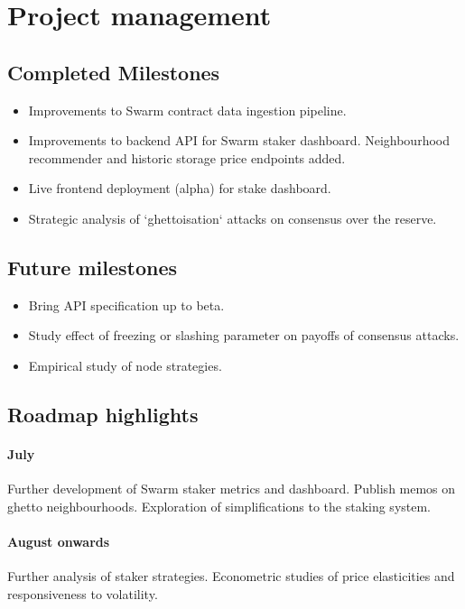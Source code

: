 \section*{Project management}

\subsection*{Completed Milestones}

\begin{itemize}
  \item 
    Improvements to Swarm contract data ingestion pipeline.
  \item 
    Improvements to backend API for Swarm staker dashboard.
    Neighbourhood recommender and historic storage price endpoints added.
  \item
    Live frontend deployment (alpha) for stake dashboard.
  \item
    Strategic analysis of `ghettoisation` attacks on consensus over the reserve.

\end{itemize}

\subsection*{Future milestones}

\begin{itemize}
  \item Bring API specification up to beta.
  \item Study effect of freezing or slashing parameter on payoffs of consensus attacks.
  \item Empirical study of node strategies. 
\end{itemize}


\subsection*{Roadmap highlights}

\paragraph{July} 
%
Further development of Swarm staker metrics and dashboard. 
%
Publish memos on ghetto neighbourhoods.
%
Exploration of simplifications to the staking system.

\paragraph{August onwards}
%
Further analysis of staker strategies.
%
Econometric studies of price elasticities and responsiveness to volatility.

